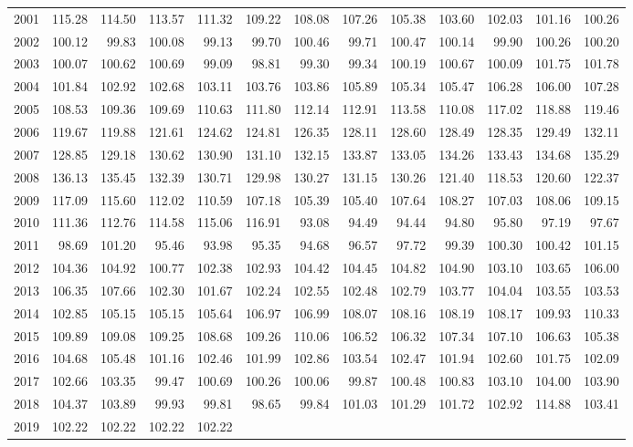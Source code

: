 \begin{longtable}{rrrrrrrrrrrrr}
  2001 & 115.28 & 114.50 & 113.57 & 111.32 & 109.22 & 108.08 & 107.26 & 105.38 & 103.60 & 102.03 & 101.16 & 100.26 \\ 
  2002 & 100.12 & 99.83 & 100.08 & 99.13 & 99.70 & 100.46 & 99.71 & 100.47 & 100.14 & 99.90 & 100.26 & 100.20 \\ 
  2003 & 100.07 & 100.62 & 100.69 & 99.09 & 98.81 & 99.30 & 99.34 & 100.19 & 100.67 & 100.09 & 101.75 & 101.78 \\ 
  2004 & 101.84 & 102.92 & 102.68 & 103.11 & 103.76 & 103.86 & 105.89 & 105.34 & 105.47 & 106.28 & 106.00 & 107.28 \\ 
  2005 & 108.53 & 109.36 & 109.69 & 110.63 & 111.80 & 112.14 & 112.91 & 113.58 & 110.08 & 117.02 & 118.88 & 119.46 \\ 
  2006 & 119.67 & 119.88 & 121.61 & 124.62 & 124.81 & 126.35 & 128.11 & 128.60 & 128.49 & 128.35 & 129.49 & 132.11 \\ 
  2007 & 128.85 & 129.18 & 130.62 & 130.90 & 131.10 & 132.15 & 133.87 & 133.05 & 134.26 & 133.43 & 134.68 & 135.29 \\ 
  2008 & 136.13 & 135.45 & 132.39 & 130.71 & 129.98 & 130.27 & 131.15 & 130.26 & 121.40 & 118.53 & 120.60 & 122.37 \\ 
  2009 & 117.09 & 115.60 & 112.02 & 110.59 & 107.18 & 105.39 & 105.40 & 107.64 & 108.27 & 107.03 & 108.06 & 109.15 \\ 
  2010 & 111.36 & 112.76 & 114.58 & 115.06 & 116.91 & 93.08 & 94.49 & 94.44 & 94.80 & 95.80 & 97.19 & 97.67 \\ 
  2011 & 98.69 & 101.20 & 95.46 & 93.98 & 95.35 & 94.68 & 96.57 & 97.72 & 99.39 & 100.30 & 100.42 & 101.15 \\ 
  2012 & 104.36 & 104.92 & 100.77 & 102.38 & 102.93 & 104.42 & 104.45 & 104.82 & 104.90 & 103.10 & 103.65 & 106.00 \\ 
  2013 & 106.35 & 107.66 & 102.30 & 101.67 & 102.24 & 102.55 & 102.48 & 102.79 & 103.77 & 104.04 & 103.55 & 103.53 \\ 
  2014 & 102.85 & 105.15 & 105.15 & 105.64 & 106.97 & 106.99 & 108.07 & 108.16 & 108.19 & 108.17 & 109.93 & 110.33 \\ 
  2015 & 109.89 & 109.08 & 109.25 & 108.68 & 109.26 & 110.06 & 106.52 & 106.32 & 107.34 & 107.10 & 106.63 & 105.38 \\ 
  2016 & 104.68 & 105.48 & 101.16 & 102.46 & 101.99 & 102.86 & 103.54 & 102.47 & 101.94 & 102.60 & 101.75 & 102.09 \\ 
  2017 & 102.66 & 103.35 & 99.47 & 100.69 & 100.26 & 100.06 & 99.87 & 100.48 & 100.83 & 103.10 & 104.00 & 103.90 \\ 
  2018 & 104.37 & 103.89 & 99.93 & 99.81 & 98.65 & 99.84 & 101.03 & 101.29 & 101.72 & 102.92 & 114.88 & 103.41 \\ 
  2019 & 102.22 & 102.22 & 102.22 & 102.22 &  &  &  &  &  &  &  &  \\ 
   \hline
\hline
\end{longtable}
